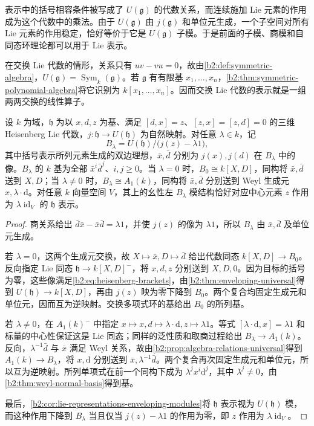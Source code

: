 表示中的括号相容条件被写成了 \(U(\mathfrak g)\) 的代数关系，而连续施加 Lie 元素的作用成为这个代数中的乘法。由于 \(U(\mathfrak g)\) 由 \(j(\mathfrak g)\) 和单位元生成，一个子空间对所有 Lie 元素的作用稳定，恰好等价于它是 \(U(\mathfrak g)\) 子模。于是前面的子模、商模和自同态环理论都可以用于 Lie 表示。

\ProseParagraphBreak
在交换 Lie 代数的情形，关系只有 \(uv-vu=0\)，故由\cref{b2:def:symmetric-algebra}，\(U(\mathfrak g)=\operatorname{Sym}_k(\mathfrak g)\)。若 \(\mathfrak g\) 有有限基 \(x_1,\ldots,x_n\)，\cref{b2:thm:symmetric-polynomial-algebra}将它识别为 \(k[x_1,\ldots,x_n]\)。因而交换 Lie 代数的表示就是一组两两交换的线性算子。

\begin{proposition}\label{b2:prop:heisenberg-enveloping-weyl}
	设 \(k\) 为域，\(\mathfrak h\) 为以 \(x,d,z\) 为基、满足 \([d,x]=z\)、\([z,x]=[z,d]=0\) 的三维 Heisenberg Lie 代数，\(j:\mathfrak h\rightarrow U(\mathfrak h)\) 为自然映射。对任意 \(\lambda\in k\)，记
	\[
		B_\lambda=U(\mathfrak h)/\bigl(j(z)-\lambda1\bigr),
	\]
	其中括号表示所列元素生成的双边理想，\(\bar x,\bar d\) 分别为 \(j(x),j(d)\) 在 \(B_\lambda\) 中的像。\(B_\lambda\) 的 \(k\) 基为全部 \(\bar x^i\bar d^j\)、\(i,j\ge0\)。当 \(\lambda=0\) 时，\(B_0\cong k[X,D]\)，同构将 \(\bar x,\bar d\) 送到 \(X,D\)；当 \(\lambda\ne0\) 时，\(B_\lambda\cong A_1(k)\)，同构将 \(\bar x,\bar d\) 分别送到 Weyl 生成元 \(x,\lambda\cdot\mathrm{d}\)。对任意 \(k\) 向量空间 \(V\)，其上的幺性左 \(B_\lambda\) 模结构恰好对应中心元素 \(z\) 作用为 \(\lambda\operatorname{id}_V\) 的 \(\mathfrak h\) 表示。
\end{proposition}
\begin{proof}
	商关系给出 \(\bar d\bar x-\bar x\bar d=\lambda1\)，并使 \(j(z)\) 的像为 \(\lambda1\)，所以 \(B_\lambda\) 由 \(\bar x,\bar d\) 及单位元生成。

	若 \(\lambda=0\)，这两个生成元交换，故 \(X\mapsto\bar x,D\mapsto\bar d\) 给出代数同态 \(k[X,D]\to B_0\)。反向指定 Lie 同态 \(\mathfrak h\to k[X,D]^-\)，将 \(x,d,z\) 分别送到 \(X,D,0\)。因为目标的括号为零，这些像满足\eqref{b2:eq:heisenberg-brackets}，由\cref{b2:thm:enveloping-universal}得到 \(U(\mathfrak h)\to k[X,D]\)，再由 \(j(z)\) 映为零下降到 \(B_0\)。两个复合均固定生成元和单位元，因而互为逆映射。交换多项式环的基给出 \(B_0\) 的所列基。

	若 \(\lambda\ne0\)，在 \(A_1(k)^-\) 中指定 \(x\mapsto x,d\mapsto\lambda\cdot\mathrm{d},z\mapsto\lambda1\)。等式 \([\lambda\cdot\mathrm{d},x]=\lambda1\) 和标量的中心性保证这是 Lie 同态；同样的泛性质和取商过程给出 \(B_\lambda\to A_1(k)\)。反向，\(\lambda^{-1}\bar d\) 与 \(\bar x\) 满足 Weyl 关系，故由\cref{b2:prop:algebra-relations-universal}得到 \(A_1(k)\to B_\lambda\)，将 \(x,\mathrm{d}\) 分别送到 \(\bar x,\lambda^{-1}\bar d\)。两个复合再次固定生成元和单位元，所以互为逆映射。所列单项式在前一个同构下成为 \(\lambda^jx^i\mathrm{d}^j\)，其中 \(\lambda^j\ne0\)，由\cref{b2:thm:weyl-normal-basis}得到基。

	最后，\cref{b2:cor:lie-representations-enveloping-modules}将 \(\mathfrak h\) 表示视为 \(U(\mathfrak h)\) 模，而这种作用下降到 \(B_\lambda\) 当且仅当 \(j(z)-\lambda1\) 的作用为零，即 \(z\) 作用为 \(\lambda\operatorname{id}_V\)。
\end{proof}

